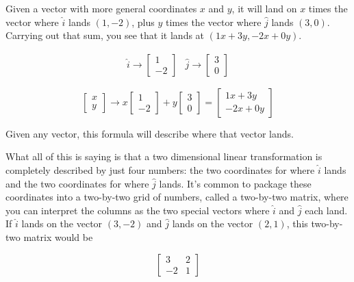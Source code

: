 Given a vector with more general coordinates $x$ and $y$, it will land on $x$
times the vector where $\hat{i}$ lands $(1, -2)$, plus $y$ times the vector
where $\hat{j}$ lands $(3, 0)$. Carrying out that sum, you see that it lands at
$(1x + 3y, -2x + 0y)$.

\begin{equation*}
  \begin{array}{cc}
    \hat{i} \rightarrow \begin{bmatrix}
      1 \\
      -2
    \end{bmatrix} &
    \hat{j} \rightarrow \begin{bmatrix}
      3 \\
      0
    \end{bmatrix}
  \end{array}
\end{equation*}

\begin{equation*}
  \begin{bmatrix}
    x \\
    y
  \end{bmatrix} \rightarrow x\begin{bmatrix}
    1 \\
    -2
  \end{bmatrix} + y\begin{bmatrix}
    3 \\
    0
  \end{bmatrix} = \begin{bmatrix}
    1x + 3y \\
    -2x + 0y
  \end{bmatrix}
\end{equation*}

Given any vector, this formula will describe where that vector lands.

What all of this is saying is that a two dimensional linear transformation is
completely described by just four numbers: the two coordinates for where
$\hat{i}$ lands and the two coordinates for where $\hat{j}$ lands. It's common
to package these coordinates into a two-by-two grid of numbers, called a
two-by-two matrix, where you can interpret the columns as the two special
vectors where $\hat{i}$ and $\hat{j}$ each land. If $\hat{i}$ lands on the
vector $(3, -2)$ and $\hat{j}$ lands on the vector $(2, 1)$, this two-by-two
matrix would be

\begin{equation*}
  \begin{bmatrix}
    3 & 2 \\
    -2 & 1
  \end{bmatrix}
\end{equation*}

